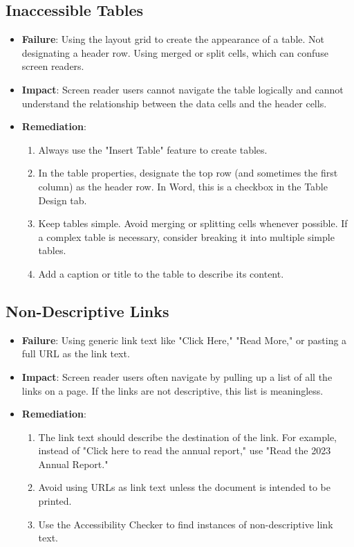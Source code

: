 \subsection{Inaccessible Tables}
\label{subsec:failures-tables}
\begin{itemize}
	\item \textbf{Failure}: Using the layout grid to create the appearance of a table. Not designating a header row. Using merged or split cells, which can confuse screen readers.
	\item \textbf{Impact}: Screen reader users cannot navigate the table logically and cannot understand the relationship between the data cells and the header cells.
	\item \textbf{Remediation}:
	      \begin{enumerate}
		      \item Always use the "Insert Table" feature to create tables.
		      \item In the table properties, designate the top row (and sometimes the first column) as the header row. In Word, this is a checkbox in the Table Design tab.
		      \item Keep tables simple. Avoid merging or splitting cells whenever possible. If a complex table is necessary, consider breaking it into multiple simple tables.
		      \item Add a caption or title to the table to describe its content.
	      \end{enumerate}
\end{itemize}

\subsection{Non-Descriptive Links}
\label{subsec:failures-links}
\begin{itemize}
	\item \textbf{Failure}: Using generic link text like "Click Here," "Read More," or pasting a full URL as the link text.
	\item \textbf{Impact}: Screen reader users often navigate by pulling up a list of all the links on a page. If the links are not descriptive, this list is meaningless.
	\item \textbf{Remediation}:
	      \begin{enumerate}
		      \item The link text should describe the destination of the link. For example, instead of "Click here to read the annual report," use "Read the 2023 Annual Report."
		      \item Avoid using URLs as link text unless the document is intended to be printed.
		      \item Use the Accessibility Checker to find instances of non-descriptive link text.
	      \end{enumerate}
\end{itemize}

